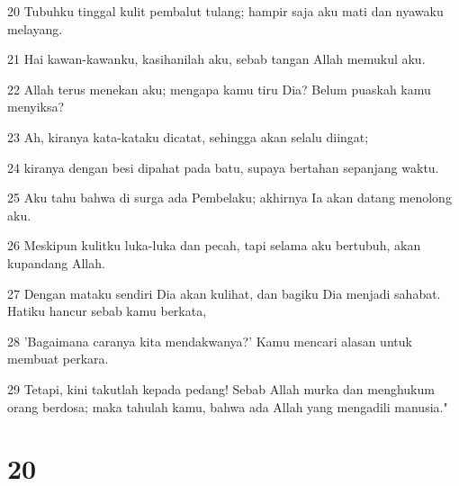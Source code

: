 \par 20 Tubuhku tinggal kulit pembalut tulang; hampir saja aku mati dan nyawaku melayang.
\par 21 Hai kawan-kawanku, kasihanilah aku, sebab tangan Allah memukul aku.
\par 22 Allah terus menekan aku; mengapa kamu tiru Dia? Belum puaskah kamu menyiksa?
\par 23 Ah, kiranya kata-kataku dicatat, sehingga akan selalu diingat;
\par 24 kiranya dengan besi dipahat pada batu, supaya bertahan sepanjang waktu.
\par 25 Aku tahu bahwa di surga ada Pembelaku; akhirnya Ia akan datang menolong aku.
\par 26 Meskipun kulitku luka-luka dan pecah, tapi selama aku bertubuh, akan kupandang Allah.
\par 27 Dengan mataku sendiri Dia akan kulihat, dan bagiku Dia menjadi sahabat. Hatiku hancur sebab kamu berkata,
\par 28 'Bagaimana caranya kita mendakwanya?' Kamu mencari alasan untuk membuat perkara.
\par 29 Tetapi, kini takutlah kepada pedang! Sebab Allah murka dan menghukum orang berdosa; maka tahulah kamu, bahwa ada Allah yang mengadili manusia."

\chapter{20}

